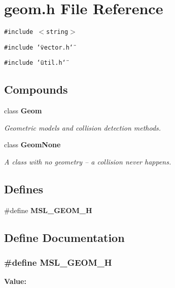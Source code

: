 \section{geom.h File Reference}
\label{geom_8h}
{\tt \#include $<$string$>$}\par
{\tt \#include \char`\"{}vector.h\char`\"{}}\par
{\tt \#include \char`\"{}util.h\char`\"{}}\par
\subsection*{Compounds}
\begin{CompactItemize}
\item 
class {\bf Geom}
\begin{CompactList}\small\item\em Geometric models and collision detection methods.\item\end{CompactList}\item 
class {\bf Geom\-None}
\begin{CompactList}\small\item\em A class with no geometry -- a collision never happens.\item\end{CompactList}\end{CompactItemize}
\subsection*{Defines}
\begin{CompactItemize}
\item 
\#define {\bf MSL\_\-GEOM\_\-H}
\end{CompactItemize}


\subsection{Define Documentation}
\subsubsection{\setlength{\rightskip}{0pt plus 5cm}\#define MSL\_\-GEOM\_\-H}\label{geom_8h_a0}


{\bf Value:}\footnotesize\begin{verbatim}
\end{verbatim}\normalsize 
